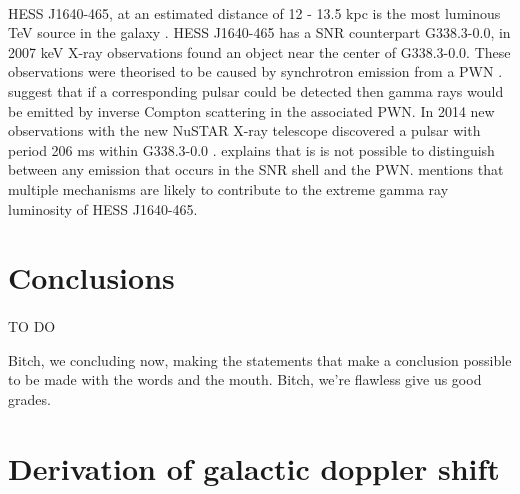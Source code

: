 \documentclass[a4paper, titlepage, oneside]{article}
\begin{document}
\begin{multicols}{2}
\paragraph{}
HESS J1640-465, at an estimated distance of 12 - 13.5 kpc is the most luminous TeV source in the galaxy \parencite{Gotthelf:2014}. HESS J1640-465 has a SNR counterpart G338.3-0.0, in 2007 keV X-ray observations  found an object near the center of  G338.3-0.0. These observations were theorised to be caused by synchrotron emission from a PWN \parencite{Funk:2007}. \textcite{Funk:2007} suggest that if a corresponding pulsar could be detected then gamma rays would be emitted by inverse Compton scattering in the associated PWN. In 2014 new observations with the new NuSTAR X-ray telescope discovered a pulsar with period 206 ms within G338.3-0.0 \parencite{Gotthelf:2014}. \textcite{Gotthelf:2014} explains that is is not possible to distinguish between any emission that occurs in the SNR shell and the PWN. \textcite{Gotthelf:2014} mentions that multiple mechanisms are likely to contribute to the extreme gamma ray luminosity of HESS J1640-465.

\section{Conclusions} %
\paragraph{}
TO DO

Bitch, we concluding now, making the statements that make a conclusion possible to be made with the words and the mouth. Bitch, we're flawless give us good grades.
\end{multicols}

\printbibliography[heading = bibintoc] %

\newpage

\appendix

\section{Derivation of galactic doppler shift}
\label{app:doppler}
\end{document}
